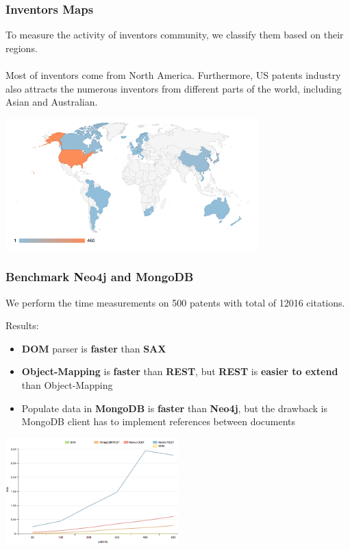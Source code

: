 \documentclass{beamer}
\begin{document}
\begin{frame}
\frametitle{Inventors Maps}
To measure the activity of inventors community, we classify them based on their regions.\\~\\
Most of inventors come from North America. Furthermore, US patents industry also attracts the numerous inventors from different parts of the world, including Asian and Australian.
\begin{center}
\includegraphics[height=2in]{inventor-map.png}
\end{center}
\end{frame}

\begin{frame}
\frametitle{Benchmark Neo4j and MongoDB}
We perform the time measurements on 500 patents with total of 12016 citations.\\
\begin{multicols}{2}
Results:
\begin{itemize}
\item \textbf{DOM} parser is \textbf{faster} than \textbf{SAX}
\item \textbf{Object-Mapping} is \textbf{faster} than \textbf{REST}, but \textbf{REST} is \textbf{easier to extend} than Object-Mapping
\item Populate data in \textbf{MongoDB} is \textbf{faster} than \textbf{Neo4j}, but the drawback is MongoDB client has to implement references between documents
\end{itemize}
\columnbreak
\begin{center}
\includegraphics[width=0.5\textwidth]{line.png}
\end{center}
\end{multicols}
\end{frame}
\end{document}
